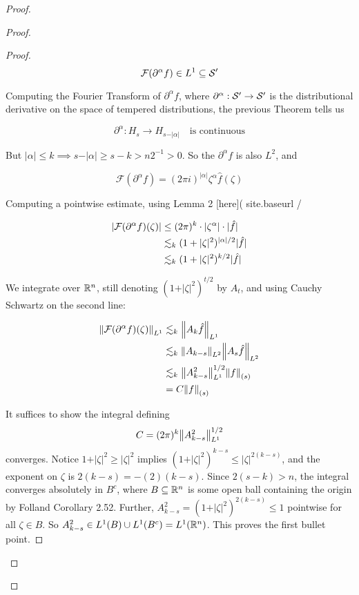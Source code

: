 \documentclass[../main-manifolds.tex]{subfiles}
\begin{document}
{{\begin{proof}
{{\begin{proof}
\begin{proof}
$$
\mathcal{F}(\partial^\alpha f)\in L^1\subseteq\mathcal{S}'
$$


Computing the Fourier Transform of $\partial^\alpha f$, where $\partial^\alpha: \mathcal{S}'\to\mathcal{S}'$ is the distributional derivative on the space of tempered distributions, the previous Theorem tells us 

$$
\partial^\alpha: H_s\to H_{s-\vert\alpha\vert}\quad\text{is continuous}
$$

But $\vert\alpha\vert\leq k\implies s-\vert\alpha\vert \geq s-k > n2^{-1}>0$. So the $\partial^\alpha f$ is also $L^2$, and 

$$
\mathcal{F}(\partial^\alpha f) = (2\pi i)^{\vert\alpha\vert}\zeta^{\alpha}\hat{f}(\zeta)
$$

Computing a pointwise estimate, using Lemma 2 [here]({{ site.baseurl }}/{%

$$
\begin{align}
\vert\mathcal{F}(\partial^\alpha f)(\zeta)\vert&\leq(2\pi)^{k}\cdot\vert \zeta^\alpha\vert\cdot \vert\hat{f}\vert\\
&\lesssim_k (1+\vert\zeta\vert^2)^{\vert\alpha\vert/2}\vert\hat{f}\vert\\
&\lesssim_k (1+\vert\zeta\vert^2)^{k/2}\vert\hat{f}\vert\\
\end{align}
$$

We integrate over ${\mathbb{R}^n}$, still denoting $(1+\vert\zeta\vert^2)^{t/2}$ by $A_t$, and using Cauchy Schwartz on the second line:

$$
\begin{align}
\norm{\mathcal{F}(\partial^\alpha f)(\zeta)}_{L^1}&\lesssim_k \norm{A_k \hat{f}}_{L^1}\\
&\lesssim_k \norm{A_{k-s}}_{L^2}\norm{A_{s}\hat{f}}_{L^2}\\
&\lesssim_k \norm{A^2_{k-s}}_{L^1}^{1/2}\norm{f}_{(s)}\\
&= C\norm{f}_{(s)}
\end{align}
$$

It suffices to show the integral defining $$C= (2\pi)^k\norm{A^2_{k-s}}_{L^1}^{1/2}$$ converges. Notice $1+\vert\zeta\vert^2\geq \vert\zeta\vert^2$ implies $(1+\vert\zeta\vert^2)^{k-s}\leq\vert\zeta\vert^{2(k-s)}$, and the exponent on $\zeta$ is $2(k-s) = -(2)(k-s)$. Since $2(s-k)>n$, the integral converges absolutely in $B^c$, where $B\subseteq{\mathbb{R}^n}$ is some open ball containing the origin by Folland Corollary 2.52. Further, $A_{k-s}^{2} = (1+\vert\zeta\vert^2)^{2(k-s)}\leq 1$ pointwise for all $\zeta\in B$. So $A_{k-s}^2\in L^1(B)\cup L^1(B^c) = L^1({\mathbb{R}^n})$. This proves the first bullet point.

}
\end{proof}
\end{proof}}}
\end{proof}}}
\end{document}
